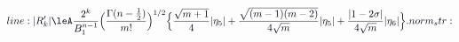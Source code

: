 \documentclass[12pt]{article}
\begin{document}
\makeatletter
\renewcommand*{\@textcolor}[3]{%
  \protect\leavevmode
  \begingroup
    \color#1{#2}#3%
  \endgroup
}
\makeatother
\begin{displaymath}
\mathcolor[RGB]{0,0,15}{line:
|R'_k|\leA\frac{2^k}{B_1^{n-1}}\Bigl(\frac{\Gamma(n-\frac12)}{m!}\Bigr)^{1/2}\Bigl\{\frac{\sqrt{m+1}}{4}|\eta_5|+\frac{\sqrt{(m-1)(m-2)}}{4\sqrt{m}}|\eta_5|+\frac{|1-2\sigma|}{4\sqrt{m}}|\eta_6|\Bigr\}.

norm_str:}
\end{displaymath}
\end{document}
